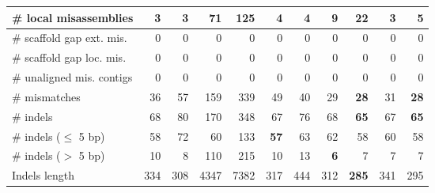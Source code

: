 \documentclass[12pt,a4paper]{article}
\begin{document}
\begin{table}[ht]
\begin{center}
\begin{tabular}{|l*{10}{|r}|}
\# local misassemblies & {\bf 3} & {\bf 3} & 71 & 125 & 4 & 4 & 9 & 22 & {\bf 3} & 5 \\ \hline
\# scaffold gap ext. mis. & 0 & 0 & 0 & 0 & 0 & 0 & 0 & 0 & 0 & 0 \\ \hline
\# scaffold gap loc. mis. & 0 & 0 & 0 & 0 & 0 & 0 & 0 & 0 & 0 & 0 \\ \hline
\# unaligned mis. contigs & 0 & 0 & 0 & 0 & 0 & 0 & 0 & 0 & 0 & 0 \\ \hline
\# mismatches & 36 & 57 & 159 & 339 & 49 & 40 & 29 & {\bf 28} & 31 & {\bf 28} \\ \hline
\# indels & 68 & 80 & 170 & 348 & 67 & 76 & 68 & {\bf 65} & 67 & {\bf 65} \\ \hline
\hspace{5mm}\# indels ($\leq$ 5 bp) & 58 & 72 & 60 & 133 & {\bf 57} & 63 & 62 & 58 & 60 & 58 \\ \hline
\hspace{5mm}\# indels ($>$ 5 bp) & 10 & 8 & 110 & 215 & 10 & 13 & {\bf 6} & 7 & 7 & 7 \\ \hline
Indels length & 334 & 308 & 4347 & 7382 & 317 & 444 & 312 & {\bf 285} & 341 & 295 \\ \hline
\end{tabular}
\end{center}
\end{table}
\end{document}
